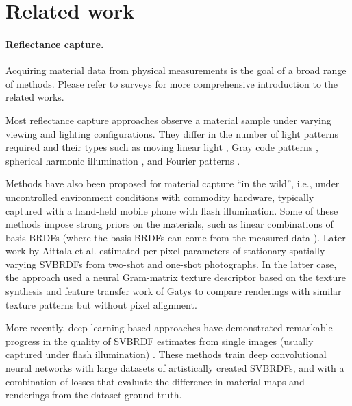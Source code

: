 \section{Related work}
\label{sec:svbrdf:related}

\paragraph{Reflectance capture.}

Acquiring material data from physical measurements is the goal of a broad range of methods.
Please refer to surveys \cite{weyrich09,Guarnera2016,dong19} for more comprehensive introduction to the related works.

Most reflectance capture approaches observe a material sample under varying viewing and lighting configurations. They differ in the number of light patterns required and their types such as moving linear light \cite{Gardner2003,Ren2011}, Gray code patterns \cite{Francken2009}, spherical harmonic illumination \cite{Ghosh2009}, and Fourier patterns \cite{Aittala2013}.

Methods have also been proposed for material capture ``in the wild'', i.e., under uncontrolled environment conditions with commodity hardware, typically captured with a hand-held mobile phone with flash illumination. Some of these methods impose strong priors on the materials, such as linear combinations of basis BRDFs \cite{Hui2017,Xu2016} (where the basis BRDFs can come from the measured data \cite{Matusik2003}). Later work by Aittala et al. \cite{Aittala2015,Aittala2016} estimated per-pixel parameters of stationary spatially-varying SVBRDFs from two-shot and one-shot photographs.
In the latter case, the approach used a neural Gram-matrix texture descriptor based on the texture synthesis and feature transfer work of Gatys \cite{Gatys2015,Gatys2016} to compare renderings with similar texture patterns but without pixel alignment.

More recently, deep learning-based approaches have demonstrated remarkable progress in the quality of SVBRDF estimates from single images (usually captured under flash illumination) \cite{Li2017,Deschaintre2018,Li2018}. These methods train deep convolutional neural networks with large datasets of artistically created SVBRDFs, and with a combination of losses that evaluate the difference in material maps and renderings from the dataset ground truth.

